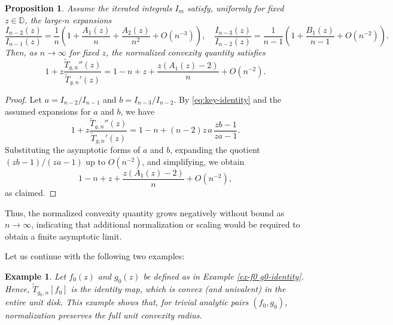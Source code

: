 \documentclass[12pt,a4paper]{amsart}
\numberwithin{equation}{section}
\newtheorem{example}{Example}[section]
\newtheorem{proposition}{Proposition}[section]
\theoremstyle{remark}
\begin{document}
\begin{proposition}
Assume the iterated integrals \(I_m\) satisfy, uniformly for fixed \(z\in\mathbb{D}\), the large-\(n\) expansions
\[
\frac{I_{n-2}(z)}{I_{n-1}(z)}
= \frac{1}{n}\!\left(1+\frac{A_1(z)}{n}+\frac{A_2(z)}{n^2}+O(n^{-3})\right),\quad
\frac{I_{n-3}(z)}{I_{n-2}(z)}
= \frac{1}{n-1}\!\left(1+\frac{B_1(z)}{n-1}+O(n^{-2})\right).
\]
Then, as \(n\to\infty\) for fixed \(z\), the normalized convexity quantity satisfies
\[
1+z\frac{\widetilde T_{g,n}''(z)}{\widetilde T_{g,n}'(z)}
= 1 - n + z + \frac{z(A_1(z)-2)}{n} + O(n^{-2}).
\]
\end{proposition}

\begin{proof}
Let \(a=I_{n-2}/I_{n-1}\) and \(b=I_{n-3}/I_{n-2}\). 
By \eqref{eq:key-identity} and the assumed expansions for \(a\) and \(b\), we have
\[
1+z\frac{\widetilde{T}_{g,n}''(z)}{\widetilde{T}_{g,n}'(z)}
= 1 - n + (n-2)z\,a\,\frac{z b - 1}{z a - 1}.
\]
Substituting the asymptotic forms of \(a\) and \(b\), expanding the quotient \((z b - 1)/(z a - 1)\) up to \(O(n^{-2})\), and simplifying, we obtain
\[
1 - n + z + \frac{z(A_1(z) - 2)}{n} + O(n^{-2}),
\]
as claimed.
\end{proof}


Thus, the normalized convexity quantity grows negatively without bound as $n\to \infty$, indicating that additional normalization or scaling would be required to obtain a finite asymptotic limit.

Let us continue with the following two examples:

\begin{example}\label{ex:normalized-trivial}\rm
Let \(f_0(z)\) and \(g_0(z)\) be defined as in Example \ref{ex-f0 g0-identity}.
Hence, \(\widetilde{T}_{g_0,n}[f_0]\) is the identity map, which is convex (and univalent) in the entire unit disk. 
This example shows that, for trivial analytic pairs \((f_0,g_0)\), normalization preserves the full unit convexity radius.
\end{example}
\end{document}

